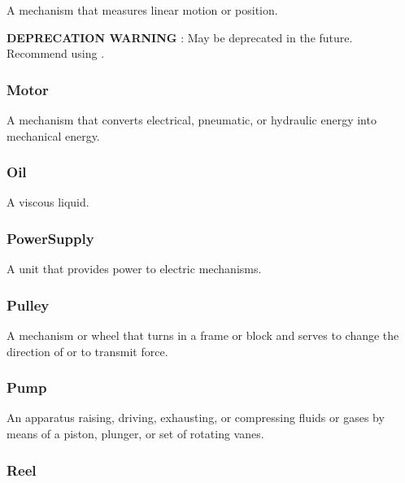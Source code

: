 A mechanism that measures linear motion or position.

\textbf{DEPRECATION WARNING} : May be deprecated in the future. Recommend using .

\FloatBarrier

\subsubsection{Motor}
\label{sec:Motor}



A mechanism that converts electrical, pneumatic, or hydraulic energy into mechanical energy.

\FloatBarrier

\subsubsection{Oil}
\label{sec:Oil}



A viscous liquid.

\FloatBarrier

\subsubsection{PowerSupply}
\label{sec:PowerSupply}



A unit that provides power to electric mechanisms.

\FloatBarrier

\subsubsection{Pulley}
\label{sec:Pulley}



A mechanism or wheel that turns in a frame or block and serves to change the direction of or to transmit force.

\FloatBarrier

\subsubsection{Pump}
\label{sec:Pump}



An apparatus raising, driving, exhausting, or compressing fluids or gases by means of a piston, plunger, or set of rotating vanes.

\FloatBarrier

\subsubsection{Reel}
\label{sec:Reel}



